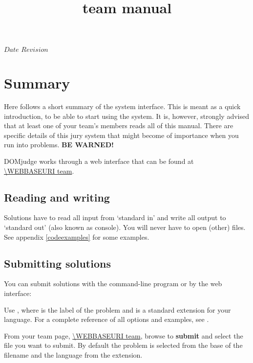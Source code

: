 

\usepackage[english]{babel}

\newcommand\NWERC{\textsc{nwerc}}

\SVN $Date$
\SVN $Revision$

\title{\DOMjudge team manual}





\section*{Summary}

Here follows a short summary of the system interface. This is meant as a quick
introduction, to be able to start using the system. It is, however, strongly
advised that at least one of your team's members reads all of this manual.
There are specific details of this jury system that might become of importance
when you run into problems. \textbf{BE WARNED!}

DOMjudge works through a web interface that can be found at\\
\url{\WEBBASEURI team}.

\subsection*{Reading and writing}

Solutions have to read all input from `standard in' and write all
output to `standard out' (also known as console). You will never have
to open (other) files. See appendix \ref{codeexamples} for some
examples.

\subsection*{Submitting solutions}

You can submit solutions with the command-line program  or
by the web interface:
\begin{description}[\breaklabel\setlabelstyle{\bfseries}]
\item[Command-line]
Use , where  is the
label of the problem and  is a standard extension for
your language.  For a complete reference of all options and examples,
see .
\item[Web interface]
From your team page, \url{\WEBBASEURI team}, browse to
\textbf{submit} and select the file you want to submit. By default
the problem is selected from the base of the filename and the language
from the extension.
\end{description}

